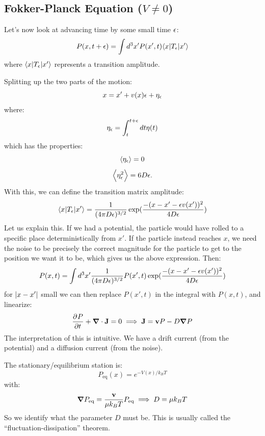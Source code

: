 \subsection{Fokker-Planck Equation ($V \neq 0$)}

Let's now look at advancing time by some small time $\epsilon$:
\begin{equation}
    P(x, t + \epsilon) = \int d^3x' P(x', t)\langle x \rvert T_\epsilon\lvert x' \rangle
\end{equation}
where $\langle x \rvert T_\epsilon\lvert x' \rangle$ represents a transition amplitude.

Splitting up the two parts of the motion:
\begin{equation}
    x = x' + v(x)\epsilon + \eta_\epsilon
\end{equation}
where:
\begin{equation}
    \eta_\epsilon = \int_t^{t+\epsilon}dt\eta(t)
\end{equation}
which has the properties:
\begin{equation}
    \left< \eta_\epsilon \right> = 0
\end{equation}
\begin{equation}
    \left< \eta_\epsilon^2 \right> = 6D\epsilon.
\end{equation}
With this, we can define the transition matrix amplitude:
\begin{equation}
    \langle x \rvert T_\epsilon\lvert x' \rangle = \frac{1}{(4\pi D\epsilon)^{3/2}} \exp(\frac{-(x - x' - \epsilon v(x'))^2}{4D\epsilon})
\end{equation}
Let us explain this. If we had a potential, the particle would have rolled to a specific place deterministically from $x'$. If the particle instead reaches $x$, we need the noise to be precisely the correct magnitude for the particle to get to the position we want it to be, which gives us the above expression. Then:
\begin{equation}
    P(x, t) = \int d^3x' \frac{1}{(4\pi D\epsilon)^{3/2}}P(x', t) \exp(\frac{-(x - x' - \epsilon v(x'))^2}{4D\epsilon})
\end{equation}
for $\lvert x - x' \rvert$ small we can then replace $P(x', t)$ in the integral with $P(x, t)$, and linearize:
\begin{equation}
    \dpd{P}{t} + \nabla \cdot \v{J} = 0 \implies \v{J} = \v{v}P - D\nabla P
\end{equation}
The interpretation of this is intuitive. We have a drift current (from the potential) and a diffusion current (from the noise).

The stationary/equilibrium station is:
\begin{equation}
    P_{\text{eq}}(x) = e^{-V(x)/k_B T}
\end{equation}
with:
\begin{equation}
    \nabla P_{\text{eq}} = \frac{\v{v}}{\mu k_B T}P_{\text{eq}} \implies D = \mu k_B T
\end{equation}
So we identify what the parameter $D$ must be. This is usually called the ``fluctuation-dissipation'' theorem.

